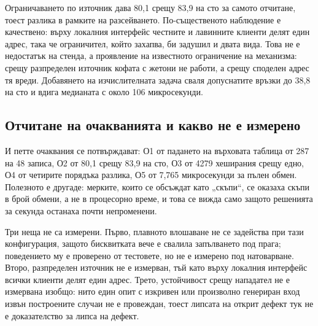 Ограничаването по източник дава 80,1 срещу 83,9 на сто за самото отчитане, тоест разлика в
рамките на разсейването. По-същественото наблюдение е качествено: върху локалния интерфейс
честните и лавинните клиенти делят един адрес, така че ограничител, който захапва, би задушил и
двата вида. Това не е недостатък на стенда, а проявление на известното ограничение на механизма:
срещу разпределен източник кофата с жетони не работи, а срещу споделен адрес тя вреди. Добавянето
на изчислителната задача сваля допуснатите връзки до 38,8 на сто и вдига медианата с около 106
микросекунди.

\subsection{Отчитане на очакванията и какво не е измерено}
\label{subsec:res_hypotheses}

И петте очаквания се потвърждават: О1 от падането на върховата таблица от 287 на 48 записа, О2 от
80,1 срещу 83,9 на сто, О3 от 4279 хеширания срещу едно, О4 от четирите порядъка разлика, О5 от
7,765 микросекунди за пълен обмен. Полезното е другаде: мерките, които се обсъждат като „скъпи“,
се оказаха скъпи в брой обмени, а не в процесорно време, и това се вижда само защото решенията за
секунда останаха почти непроменени.

Три неща не са измерени. Първо, плавното влошаване не се задейства при тази конфигурация, защото
бисквитката вече е свалила запълването под прага;
поведението му е проверено от тестовете, но не е измерено под натоварване. Второ, разпределен
източник не е измерван, тъй като върху локалния интерфейс всички клиенти делят един адрес. Трето,
устойчивост срещу нападател не е измервана изобщо: нито един опит с изкривен или произволно
генериран вход извън построените случаи не е провеждан, тоест липсата на открит дефект тук не е
доказателство за липса на дефект.
